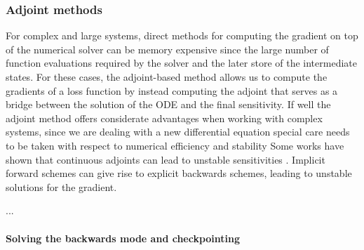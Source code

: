 \subsubsection{Adjoint methods}
\label{section:computing-adjoints}


For complex and large systems, direct methods for computing the gradient on top of the numerical solver can be memory expensive since the large number of function evaluations required by the solver and the later store of the intermediate states. 
For these cases, the adjoint-based method allows us to compute the gradients of a loss function by instead computing the adjoint that serves as a bridge between the solution of the ODE and the final sensitivity. 
If well the adjoint method offers considerate advantages when working with complex systems, since we are dealing with a new differential equation special care needs to be taken with respect to numerical efficiency and stability
Some works have shown that continuous adjoints can lead to unstable sensitivities \cite{Jensen_Nakshatrala_Tortorelli_2014}.
Implicit forward schemes can give rise to explicit backwards schemes, leading to unstable solutions for the gradient. 

...

\paragraph{Solving the backwards mode and checkpointing}

